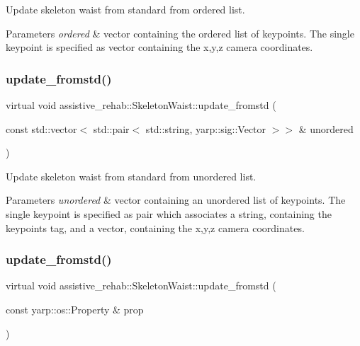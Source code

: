 Update skeleton waist from standard from ordered list. 


\begin{DoxyParams}{Parameters}
{\em ordered} & vector containing the ordered list of keypoints. The single keypoint is specified as vector containing the x,y,z camera coordinates. \\
\hline
\end{DoxyParams}
\mbox{\label{classassistive__rehab_1_1SkeletonWaist_a88b7b4a3d8a0cf2916b5664fbb53d7ac}} 
\subsubsection{\texorpdfstring{update\_fromstd()}{update\_fromstd()}\hspace{0.1cm}{\footnotesize\ttfamily [2/3]}}
{\footnotesize\ttfamily virtual void assistive\+\_\+rehab\+::\+Skeleton\+Waist\+::update\+\_\+fromstd (\begin{DoxyParamCaption}\item[{const std\+::vector$<$ std\+::pair$<$ std\+::string, yarp\+::sig\+::\+Vector $>$$>$ \&}]{unordered }\end{DoxyParamCaption})\hspace{0.3cm}{\ttfamily [virtual]}}



Update skeleton waist from standard from unordered list. 


\begin{DoxyParams}{Parameters}
{\em unordered} & vector containing an unordered list of keypoints. The single keypoint is specified as pair which associates a string, containing the keypoint\textquotesingle{}s tag, and a vector, containing the x,y,z camera coordinates. \\
\hline
\end{DoxyParams}
\mbox{\label{classassistive__rehab_1_1SkeletonWaist_a213c2e64f75fd247e1b37ffbc126399f}} 
\subsubsection{\texorpdfstring{update\_fromstd()}{update\_fromstd()}\hspace{0.1cm}{\footnotesize\ttfamily [3/3]}}
{\footnotesize\ttfamily virtual void assistive\+\_\+rehab\+::\+Skeleton\+Waist\+::update\+\_\+fromstd (\begin{DoxyParamCaption}\item[{const yarp\+::os\+::\+Property \&}]{prop }\end{DoxyParamCaption})\hspace{0.3cm}{\ttfamily [virtual]}}



